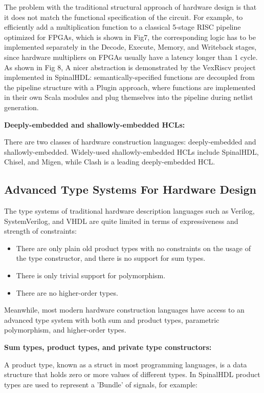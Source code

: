 \documentclass{article}
\begin{document}
The problem with the traditional structural approach of hardware design is that it does not match the functional specification of the circuit. For example, to efficiently add a multiplication function to a classical 5-stage RISC pipeline optimized for FPGAs, which is shown in Fig7, the corresponding logic has to be implemented separately in the Decode, Execute, Memory, and Writeback stages, since hardware multipliers on FPGAs usually have a latency longer than 1 cycle. As shown in Fig 8, A nicer abstraction is demonstrated by the VexRiscv project implemented in SpinalHDL: semantically-specified functions are decoupled from the pipeline structure with a Plugin approach, where functions are implemented in their own Scala modules and plug themselves into the pipeline during netlist generation.

\textbf{Deeply-embedded and shallowly-embedded HCLs:}

There are two classes of hardware construction languages: deeply-embedded and shallowly-embedded. Widely-used shallowly-embedded HCLs include SpinalHDL, Chisel, and Migen, while Clash is a leading deeply-embedded HCL.

\subsection{Advanced Type Systems For Hardware Design}
The type systems of traditional hardware description languages such as Verilog, SystemVerilog, and VHDL are quite limited in terms of expressiveness and strength of constraints:
\begin{itemize}
    \item There are only plain old product types with no constraints on the usage of the type constructor, and there is no support for sum types.
    \item There is only trivial support for polymorphism.
    \item There are no higher-order types.
\end{itemize}

Meanwhile, most modern hardware construction languages have access to an advanced type system with both sum and product types, parametric polymorphism, and higher-order types.


\textbf{Sum types, product types, and private type constructors: }

A product type, known as a struct in most programming languages, is a data structure that holds zero or more values of different types. In SpinalHDL product types are used to represent a 'Bundle' of signals, for example:
\end{document}
